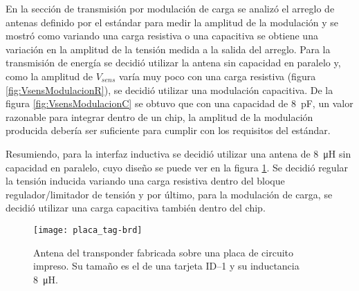 \bigskip
En la sección de transmisión por modulación de carga se analizó el 
arreglo de antenas definido por el estándar para medir la amplitud de 
la modulación y se mostró como variando una carga resistiva o una 
capacitiva se obtiene una variación en la amplitud de la tensión 
medida a la salida del arreglo. Para la transmisión de energía se 
decidió utilizar la antena sin capacidad en paralelo y, como la 
amplitud de \(V_{sens}\) varía muy poco con una carga resistiva 
(figura \ref{fig:VsensModulacionR}), se 
decidió utilizar una modulación capacitiva. De la figura 
\ref{fig:VsensModulacionC} se obtuvo que con una capacidad de 
\SI{8}{\pico\farad}, un valor razonable para integrar dentro de un 
chip, la amplitud de la modulación producida debería ser suficiente para 
cumplir con los requisitos del estándar.

Resumiendo, para la interfaz inductiva se decidió utilizar una antena 
de \SI{8}{\micro\henry} sin capacidad en paralelo, cuyo diseño se puede 
ver en la figura \ref{fig:DisenioAntena}. Se decidió regular la 
tensión inducida variando una carga resistiva dentro del bloque 
regulador/limitador de tensión y por último, para la modulación de 
carga, se decidió utilizar una carga capacitiva también dentro del 
chip.

\begin{figure}
	\centering
	\texttt{[image: placa\_tag-brd]}
	\caption{Antena del transponder fabricada sobre una placa de 
	circuito impreso. Su tamaño es el de una tarjeta ID--1 y su 
	inductancia \SI{8}{\micro\henry}.}
	\label{fig:DisenioAntena}
\end{figure}

